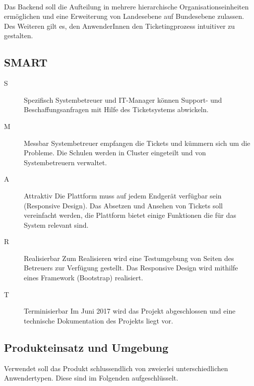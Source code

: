 \paragraph{}
Das Backend soll die Aufteilung in mehrere hierarchische Organisationseinheiten ermöglichen und eine Erweiterung von Landesebene auf Bundesebene zulassen. Des Weiteren gilt es, den AnwenderInnen den Ticketingprozess intuitiver zu gestalten.


\subsection{SMART}
\begin{description}
	\item[S] Spezifisch\newline
	Systembetreuer und IT-Manager können Support- und Beschaffungsanfragen mit Hilfe des Ticketsystems abwickeln.
	\item[M] Messbar\newline
	Systembetreuer empfangen die Tickets und kümmern sich um die Probleme. Die Schulen werden in Cluster eingeteilt und von Systembetreuern verwaltet. 
	\item[A] Attraktiv\newline
	Die Plattform muss auf jedem Endgerät verfügbar sein (Responsive Design). Das Absetzen und Ansehen von Tickets soll vereinfacht werden, die Plattform bietet einige Funktionen die für das System relevant sind.
	\item[R] Realisierbar\newline
	Zum Realisieren wird eine Testumgebung von Seiten des Betreuers zur Verfügung gestellt. Das Responsive Design wird mithilfe eines Framework (Bootstrap) realisiert.
	\item[T] Terminisierbar\newline
	Im Juni 2017 wird das Projekt abgeschlossen und eine technische Dokumentation des Projekts liegt vor.
\end{description}


\subsection{Produkteinsatz und Umgebung}
Verwendet soll das Produkt schlussendlich von zweierlei unterschiedlichen Anwendertypen. Diese sind im Folgenden aufgeschlüsselt.

